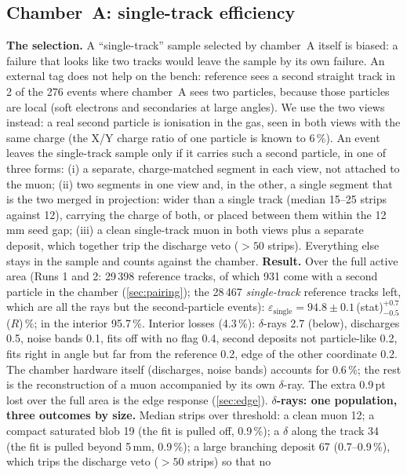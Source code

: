 \subsection{Chamber~A: single-track efficiency}\label{sec:single}
\textbf{The selection.} A ``single-track'' sample selected by chamber~A itself is biased: a failure that looks like two
tracks would leave the sample by its own failure. An external tag does not help on the bench: reference sees a second straight
track in 2 of the 276 events where chamber~A sees two particles, because those particles are local (soft electrons and
secondaries at large angles). We use the two views instead: a real second particle is ionisation in the gas, seen in both
views with the same charge (the X/Y charge ratio of one particle is known to 6\,\%). An event leaves the single-track
sample only if it carries such a second particle, in one of three forms: (i) a separate, charge-matched segment in each
view, not attached to the muon; (ii) two segments in one view and, in the other, a single segment that is the two merged
in projection: wider than a single track (median 15--25 strips against 12), carrying the charge of both, or placed
between them within the 12\,mm seed gap; (iii) a clean single-track muon in both views plus a separate deposit, which
together trip the discharge veto (${>}50$ strips). Everything else stays in the sample and counts against the chamber.
\textbf{Result.} Over the full active area (Runs 1 and 2: 29\,398 reference tracks, of which 931 come with a second particle in the chamber
(\cref{sec:pairing}); the 28\,467 \emph{single-track} reference tracks left, which are all the rays but the second-particle events):
$\varepsilon_\mathrm{single}=94.8\pm0.1$\,(stat)$^{+0.7}_{-0.5}$\,($R$)\,\%; in the interior 95.7\,\%. Interior
losses (4.3\,\%): $\delta$-rays 2.7 (below), discharges 0.5, noise bands 0.1, fits off with no flag 0.4, second deposits
not particle-like 0.2, fits right in angle but far from the reference 0.2, edge of the other coordinate 0.2. The chamber hardware itself (discharges, noise bands) accounts for 0.6\,\%; the rest is the
reconstruction of a muon accompanied by its own $\delta$-ray. The extra 0.9\,pt lost over the full area is the edge
response (\cref{sec:edge}).
\textbf{$\delta$-rays: one population, three outcomes by size.} Median strips over threshold: a clean muon 12; a
compact saturated blob 19 (the fit is pulled off, 0.9\,\%); a $\delta$ along the track 34 (the fit is pulled beyond
5\,mm, 0.9\,\%); a large branching deposit 67 (0.7--0.9\,\%), which trips the discharge veto (${>}50$ strips) so that no
